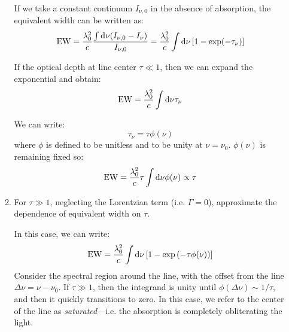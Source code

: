 \documentclass[11pt, preprint]{article}
\begin{document}
\begin{enumerate}
\begin{enumerate}
      \begin{answer}
        If we take a constant continuum $I_{\nu, 0}$ in the absence of
        absorption, the equivalent width can be written as:
        \begin{equation}
          \mathrm{EW} = \frac{\lambda_0^2}{c} \frac{\int {\rm d}\nu (I_{\nu,0} -
            I_\nu)}{I_{\nu,0}} = \frac{\lambda_0^2}{c} \int {\rm d}\nu
          \left[1 - \exp(-\tau_\nu)\right]
        \end{equation}

        If the optical depth at line center $\tau\ll 1$, then we can
        expand the exponential and obtain:
        \begin{equation}
          \mathrm{EW} = 
            \frac{\lambda_0^2}{c} \int {\rm d}\nu
          \tau_\nu
        \end{equation}

        We can write:
        \begin{equation}
          \tau_\nu = \tau \phi(\nu)
        \end{equation}
        where $\phi$ is defined to be unitless and to be unity at
        $\nu=\nu_0$. $\phi(\nu)$ is remaining fixed so:
        \begin{equation}
          \mathrm{EW} = 
            \frac{\lambda_0^2}{c} \tau \int {\rm d}\nu
          \phi(\nu) \propto \tau
        \end{equation}
      \end{answer}
    \item For $\tau\gg 1$, neglecting the Lorentzian term
      (i.e. $\Gamma = 0$), approximate the dependence of equivalent
      width on $\tau$.

      \begin{answer}
        In this case, we can write:
        \begin{equation}
          \mathrm{EW} = \frac{\lambda_0^2}{c} \int {\rm d}\nu
          \left[1 - \exp\left(-\tau \phi(\nu)\right)\right]
        \end{equation}
        Consider the spectral region around the line, with the offset
        from the line $\Delta\nu = \nu - \nu_0$. If $\tau\gg 1$, then
        the integrand is unity until $\phi(\Delta\nu) \sim 1/\tau$,
        and then it quickly transitions to zero. In  this case, we
        refer to the center of the line as {\it saturated}---i.e. the
        absorption is completely obliterating the light.


\end{answer}
\end{enumerate}
\end{enumerate}
\end{document}
